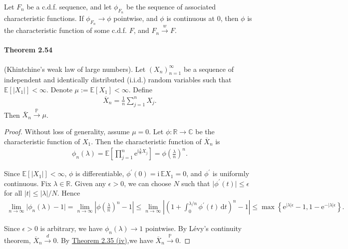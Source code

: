 \documentclass{article}
\numberwithin{equation}{section}
\newcommand{\e}{\mathrm{e}}
\newcommand{\E}{\mathbb{E}}
\renewcommand{\P}{\mathbb{P}}
\renewcommand{\d}{\mathrm{d}}
\renewcommand{\i}{\mathrm{i}}
\theoremstyle{plain}
\theoremstyle{definition}
\begin{document}
Let $F_n$ be a c.d.f. sequence, and let $\phi_{F_n}$ be the sequence of associated characteristic functions. If $\phi_{F_n}\to\phi$ pointwise, and $\phi$ is continuous at $0$, then $\phi$ is the characteristic function of some c.d.f. $F$, and $F_n\overset{w}{\to}F$.

\paragraph{Theorem 2.54\label{thm:2.54}} (Khintchine's weak law of large numbers). Let $(X_n)_{n=1}^\infty$ be a sequence of independent and identically distributed (i.i.d.) random variables such that $\E[\vert X_1\vert]<\infty$. Denote $\mu:=\E[X_1]<\infty$. Define
\begin{align*}
	\overline{X}_n = \frac{1}{n}\sum_{j=1}^n X_j.
\end{align*}
Then $\overline{X}_n\overset{\P}{\to}\mu$.
\begin{proof}
Without loss of generality, assume $\mu=0$. Let $\phi:\mathbb{R}\to\mathbb{C}$ be the characteristic function of $X_1$. Then the characteristic function of $\overline{X}_n$ is
\begin{align*}
	\phi_n(\lambda)=\E\left[\prod_{j=1}^n\e^{\i\frac{\lambda}{n}X_j}\right] = \phi\left(\frac{\lambda}{n}\right)^n.
\end{align*}

Since $\E[\vert X_1\vert]<\infty$, $\phi$ is differentiable, $\phi^\prime(0)=\i\,\E X_1=0$, and $\phi^\prime$ is uniformly continuous. Fix $\lambda\in\mathbb{R}$. Given any $\epsilon>0$, we can choose $N$ such that $\vert\phi^\prime(t)\vert\leq\epsilon$ for all $\vert t\vert \leq\vert\lambda\vert/N$. Hence
\begin{align*}
	\lim_{n\to\infty}\vert\phi_n(\lambda)-1\vert = \lim_{n\to\infty}\left\vert\phi\left(\frac{\lambda}{n}\right)^n - 1\right\vert\leq\lim_{n\to\infty}\left\vert\left(1+\int_0^{\lambda/n}\phi^\prime(t)\,\d t\right)^n - 1\right\vert\leq\max\left\{\e^{\vert\lambda\vert\epsilon} - 1, 1-\e^{-\vert\lambda\vert\epsilon}\right\}.
\end{align*}

Since $\epsilon>0$ is arbitrary, we have $\phi_n(\lambda)\to 1$ pointwise. By Lévy's continuity theorem, $\overline{X}_n\overset{d}{\to}0$. By \hyperref[thm:2.35]{Theorem 2.35 (iv)},we have  $\overline{X}_n\overset{\P}{\to}0$.
\end{proof}
\end{document}

